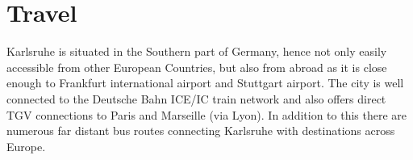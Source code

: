 
\newpage


\vspace*{5cm}

\section{Travel}

Karlsruhe is situated in the Southern part of Germany, hence not only easily
accessible from other European Countries, but also from abroad as it is close
enough to Frankfurt international airport and Stuttgart airport. The city
is well connected to the Deutsche Bahn ICE/IC train network and also offers
direct TGV connections to Paris and Marseille (via Lyon). In addition to this
there are numerous far distant bus routes connecting Karlsruhe with destinations
across Europe.


